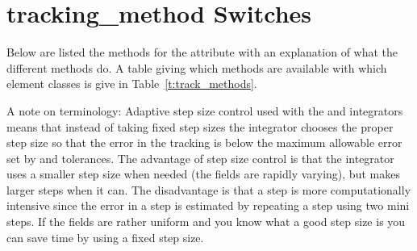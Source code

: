 \section{tracking\_method Switches}
\label{s:tkm}

Below are listed the methods for the 
attribute with an explanation of what the different methods do. A
table giving which methods are available with which element classes is give
in Table~\ref{t:track_methods}. 

A note on terminology: Adaptive step size control used with the
 and  integrators means that 
instead of taking fixed step sizes the integrator chooses the proper
step size so that the error in the tracking is below the maximum
allowable error set by  and  tolerances. The
advantage of step size control is that the integrator uses a smaller
step size when needed (the fields are rapidly varying), but makes
larger steps when it can. The disadvantage is that a step is more
computationally intensive since the error in a step is estimated by
repeating a step using two mini steps. If the fields are rather
uniform and you know what a good step size is you can save time by using
a fixed step size.

